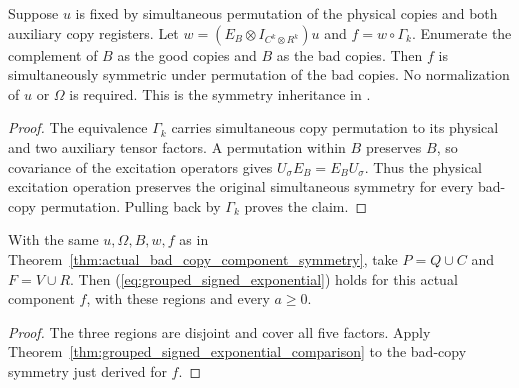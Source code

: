 \begin{theorem}
\label{thm:actual_bad_copy_component_symmetry}
\leanok
Suppose $u$ is fixed by simultaneous permutation of the physical
copies and both auxiliary copy registers. Let
$w=(E_B\otimes I_{C^k\otimes R^k})u$ and $f=w\circ\Gamma_k$.
Enumerate the complement of $B$ as the good copies and $B$ as the
bad copies. Then $f$ is simultaneously symmetric under permutation
of the bad copies. No normalization of $u$ or $\Omega$ is required.
This is the symmetry inheritance in
\cite[Section~8, lines 441--456]{OpenAI2026AreaLaw}.
\end{theorem}
\begin{proof}\leanok
The equivalence $\Gamma_k$ carries simultaneous copy permutation
to its physical and two auxiliary tensor factors. A permutation
within $B$ preserves $B$, so covariance of the excitation operators
gives $U_\sigma E_B=E_BU_\sigma$. Thus the physical excitation
operation preserves the original simultaneous symmetry for every
bad-copy permutation. Pulling back by $\Gamma_k$ proves the claim.
\end{proof}

\begin{theorem}
\label{thm:actual_component_bad_exponential_removal}
\leanok
{}
With the same $u,\Omega,B,w,f$ as in
Theorem~\ref{thm:actual_bad_copy_component_symmetry}, take
$P=Q\cup C$ and $F=V\cup R$. Then
(\ref{eq:grouped_signed_exponential}) holds for this actual
component $f$, with these regions and every $a\ge0$.
\end{theorem}
\begin{proof}\leanok
The three regions are disjoint and cover all five factors.
Apply Theorem~\ref{thm:grouped_signed_exponential_comparison} to
the bad-copy symmetry just derived for $f$.
\end{proof}
